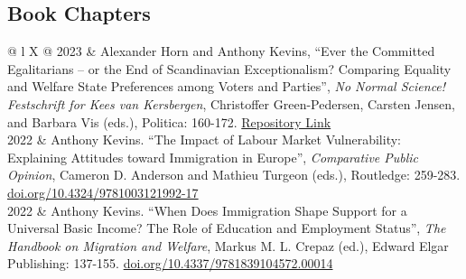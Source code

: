 \documentclass[letterpaper,fontsize=10.5pt]{scrartcl}
\begin{document}
\subsection{Book Chapters}
\vspace{-2em}
\begin{longtblr}[entry=none,label=none]{@{} l X @{} }
	2023 & Alexander Horn and Anthony Kevins, ``Ever the Committed Egalitarians – or the End of Scandinavian Exceptionalism? Comparing Equality and Welfare State Preferences among Voters and Parties'', \textit{No Normal Science! Festschrift for Kees van Kersbergen}, Christoffer Green-Pedersen, Carsten Jensen, and Barbara Vis (eds.), Politica: 160-172. \href{https://repository.lboro.ac.uk/articles/chapter/Ever_the_committed_egalitarians_or_the_end_of_Scandinavian_exceptionalism_Comparing_equality_and_welfare_state_preferences_among_voters_and_parties/24220813}{Repository Link} \\
	2022 & Anthony Kevins. ``The Impact of Labour Market Vulnerability: Explaining Attitudes toward Immigration in Europe'', \textit{Comparative Public Opinion}, Cameron D. Anderson and Mathieu Turgeon (eds.), Routledge: 259-283. \href{https://doi.org/10.4324/9781003121992-17 }{doi.org/10.4324/9781003121992-17 }                           \\
	2022 & Anthony Kevins. ``When Does Immigration Shape Support for a Universal Basic Income? The Role of Education and Employment Status'', \textit{The Handbook on Migration and Welfare}, Markus M. L. Crepaz (ed.), Edward Elgar Publishing: 137-155. \href{https://doi.org/10.4337/9781839104572.00014}{doi.org/10.4337/9781839104572.00014 } 
\end{longtblr}

\end{document}
